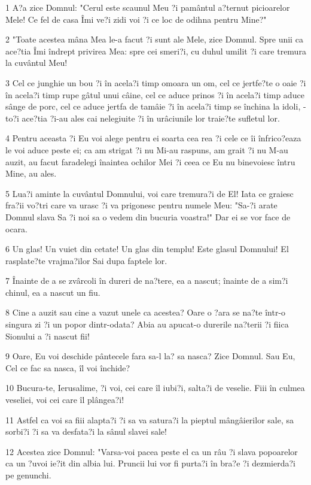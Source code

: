 \par 1 A?a zice Domnul: "Cerul este scaunul Meu ?i pamântul a?ternut picioarelor Mele! Ce fel de casa Îmi ve?i zidi voi ?i ce loc de odihna pentru Mine?"
\par 2 "Toate acestea mâna Mea le-a facut ?i sunt ale Mele, zice Domnul. Spre unii ca ace?tia Îmi îndrept privirea Mea: spre cei smeri?i, cu duhul umilit ?i care tremura la cuvântul Meu!
\par 3 Cel ce junghie un bou ?i în acela?i timp omoara un om, cel ce jertfe?te o oaie ?i în acela?i timp rupe gâtul unui câine, cel ce aduce prinos ?i în acela?i timp aduce sânge de porc, cel ce aduce jertfa de tamâie ?i în acela?i timp se închina la idoli, - to?i ace?tia ?i-au ales cai nelegiuite ?i în urâciunile lor traie?te sufletul lor.
\par 4 Pentru aceasta ?i Eu voi alege pentru ei soarta cea rea ?i cele ce îi înfrico?eaza le voi aduce peste ei; ca am strigat ?i nu Mi-au raspuns, am grait ?i nu M-au auzit, au facut faradelegi înaintea ochilor Mei ?i ceea ce Eu nu binevoiesc întru Mine, au ales.
\par 5 Lua?i aminte la cuvântul Domnului, voi care tremura?i de El! Iata ce graiesc fra?ii vo?tri care va urasc ?i va prigonesc pentru numele Meu: "Sa-?i arate Domnul slava Sa ?i noi sa o vedem din bucuria voastra!" Dar ei se vor face de ocara.
\par 6 Un glas! Un vuiet din cetate! Un glas din templu! Este glasul Domnului! El rasplate?te vrajma?ilor Sai dupa faptele lor.
\par 7 Înainte de a se zvârcoli în dureri de na?tere, ea a nascut; înainte de a sim?i chinul, ea a nascut un fiu.
\par 8 Cine a auzit sau cine a vazut unele ca acestea? Oare o ?ara se na?te într-o singura zi ?i un popor dintr-odata? Abia au apucat-o durerile na?terii ?i fiica Sionului a ?i nascut fii!
\par 9 Oare, Eu voi deschide pântecele fara sa-l la? sa nasca? Zice Domnul. Sau Eu, Cel ce fac sa nasca, îl voi închide?
\par 10 Bucura-te, Ierusalime, ?i voi, cei care îl iubi?i, salta?i de veselie. Fiii în culmea veseliei, voi cei care îl plângea?i!
\par 11 Astfel ca voi sa fiii alapta?i ?i sa va satura?i la pieptul mângâierilor sale, sa sorbi?i ?i sa va desfata?i la sânul slavei sale!
\par 12 Acestea zice Domnul: "Varsa-voi pacea peste el ca un râu ?i slava popoarelor ca un ?uvoi ie?it din albia lui. Pruncii lui vor fi purta?i în bra?e ?i dezmierda?i pe genunchi.
